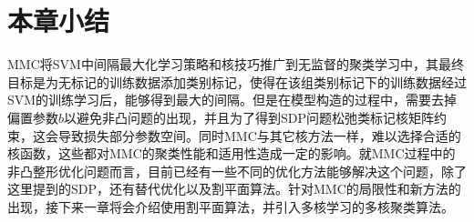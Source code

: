 \section{本章小结}
MMC将SVM中间隔最大化学习策略和核技巧推广到无监督的聚类学习中，其最终目标是为无标记的训练数据添加类别标记，使得在该组类别标记下的训练数据经过SVM的训练学习后，能够得到最大的间隔。但是在模型构造的过程中，需要去掉偏置参数$b$以避免非凸问题的出现，并且为了得到SDP问题松弛类标记核矩阵约束，这会导致损失部分参数空间。同时MMC与其它核方法一样，难以选择合适的核函数，这些都对MMC的聚类性能和适用性造成一定的影响。就MMC过程中的非凸整形优化问题而言，目前已经有一些不同的优化方法能够解决这个问题，除了这里提到的SDP，还有替代优化以及割平面算法。针对MMC的局限性和新方法的出现，接下来一章将会介绍使用割平面算法，并引入多核学习的多核聚类算法。